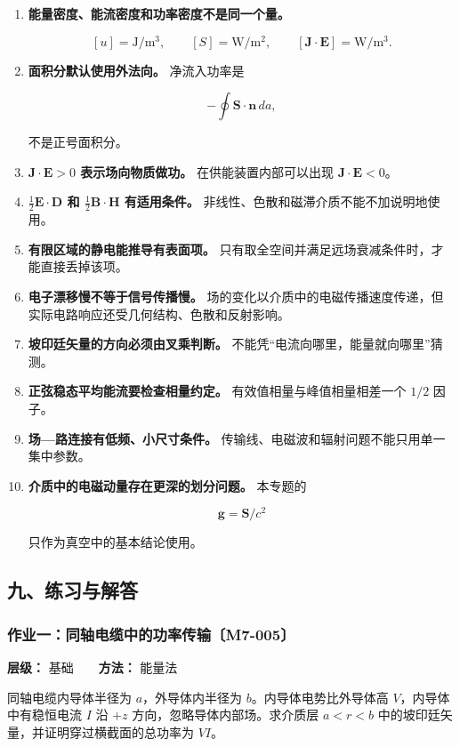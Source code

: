 \begin{enumerate}
\def\labelenumi{\arabic{enumi}.}
\item
  \textbf{能量密度、能流密度和功率密度不是同一个量。}

  \[
  [u]=\mathrm{J/m^3},
  \qquad
  [S]=\mathrm{W/m^2},
  \qquad
  [\mathbf J\cdot\mathbf E]=\mathrm{W/m^3}.
  \]
\item
  \textbf{面积分默认使用外法向。} 净流入功率是

  \[
  -\oint\mathbf S\cdot\mathbf n\,da,
  \]

  不是正号面积分。
\item
  \textbf{\(\mathbf J\cdot\mathbf E>0\) 表示场向物质做功。}
  在供能装置内部可以出现 \(\mathbf J\cdot\mathbf E<0\)。
\item
  \textbf{\(\tfrac12\mathbf E\cdot\mathbf D\) 和
  \(\tfrac12\mathbf B\cdot\mathbf H\) 有适用条件。}
  非线性、色散和磁滞介质不能不加说明地使用。
\item
  \textbf{有限区域的静电能推导有表面项。}
  只有取全空间并满足远场衰减条件时，才能直接丢掉该项。
\item
  \textbf{电子漂移慢不等于信号传播慢。}
  场的变化以介质中的电磁传播速度传递，但实际电路响应还受几何结构、色散和反射影响。
\item
  \textbf{坡印廷矢量的方向必须由叉乘判断。}
  不能凭``电流向哪里，能量就向哪里''猜测。
\item
  \textbf{正弦稳态平均能流要检查相量约定。} 有效值相量与峰值相量相差一个
  \(1/2\) 因子。
\item
  \textbf{场---路连接有低频、小尺寸条件。}
  传输线、电磁波和辐射问题不能只用单一集中参数。
\item
  \textbf{介质中的电磁动量存在更深的划分问题。} 本专题的

  \[
  \mathbf g=\mathbf S/c^2
  \]

  只作为真空中的基本结论使用。
\end{enumerate}

\subsection{九、练习与解答}\label{m7:ux4e5dux7ec3ux4e60ux4e0eux89e3ux7b54}

\par{}
\noindent\begin{minipage}{\linewidth}

\subsubsection{作业一：同轴电缆中的功率传输〔M7-005〕}\label{m7:ux4f5cux4e1aux4e00ux540cux8f74ux7535ux7f06ux4e2dux7684ux529fux7387ux4f20ux8f93m7-005}

\textbf{层级：} 基础　　\textbf{方法：} 能量法

同轴电缆内导体半径为 \(a\)，外导体内半径为 \(b\)。内导体电势比外导体高
\(V\)，内导体中有稳恒电流 \(I\) 沿 \(+z\) 方向，忽略导体内部场。求介质层
\(a<r<b\) 中的坡印廷矢量，并证明穿过横截面的总功率为 \(VI\)。

\end{minipage}\par

